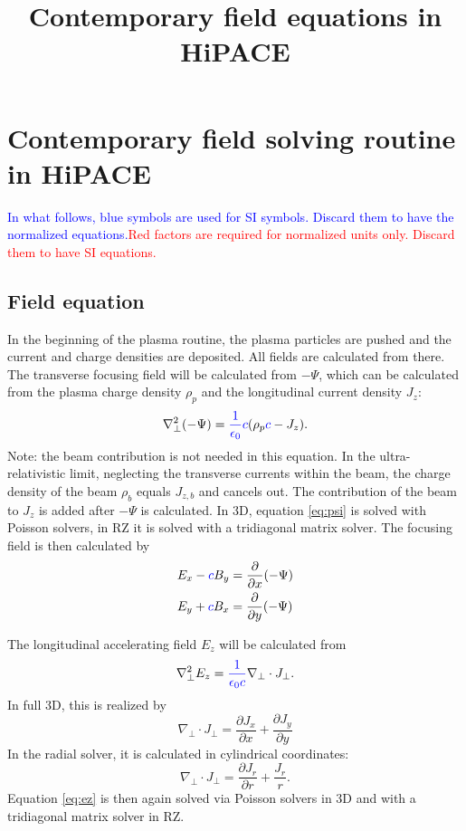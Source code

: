 \documentclass{article}
\title{Contemporary field equations in HiPACE}
\begin{document}
\section*{Contemporary field solving routine in HiPACE}
\label{se:pic_rad_field_solver}

\newcommand{\blue}[1]{\textcolor{blue}{#1}}
\newcommand{\red}[1]{\textcolor{red}{#1}}

\blue{In what follows, blue symbols are used for SI symbols. Discard them to have the normalized equations.}\red{Red factors are required for normalized units only. Discard them to have SI equations.}

\subsection*{Field equation}

In the beginning of the plasma routine, the plasma particles are pushed and the current and charge densities are deposited. All fields are calculated from there.
The transverse focusing field will be calculated from $-\Psi$, which can be calculated from the plasma charge density $\rho_p$ and the longitudinal current density $J_z$:
\begin{equation}
\nabla^2_{\perp} (- \Psi)  = \blue{\frac{1}{\epsilon_0} c} (\rho_p \blue{c} - J_z ).
\label{eq:psi}
\end{equation}
Note: the beam contribution is not needed in this equation. In the ultra-relativistic limit, neglecting the transverse currents within the beam, the charge density of the beam $\rho_b$ equals $J_{z,b}$ and cancels out. The contribution of the beam to $J_z$ is added after $-\Psi$ is calculated.
In 3D, equation \ref{eq:psi} is solved with Poisson solvers, in RZ it is solved with a tridiagonal matrix solver.
The focusing field is then calculated by
\begin{subequations}
\begin{align}
    E_x - \blue{c}B_y &= \frac{\partial}{\partial x} (-\Psi) \\
    E_y + \blue{c}B_x &= \frac{\partial}{\partial y} (-\Psi)
\end{align}
\end{subequations}


The longitudinal accelerating field $E_z$ will be calculated from
\begin{equation} \label{eq:ez}
\nabla^2_{\perp} E_z = \blue{\frac{1}{\epsilon_0 c}} \nabla_{\perp} \cdot  J_{\perp} .
\end{equation}
In full 3D, this is realized by
\begin{equation}
    \nabla_{\perp} \cdot J_{\perp} = \frac{\partial J_x}{\partial x} +  \frac{\partial J_y}{\partial y}
\end{equation}
In the radial solver, it is calculated in cylindrical coordinates:
\begin{equation}
    \nabla_{\perp} \cdot J_{\perp} = \frac{\partial J_r}{\partial r} + \frac{J_r}{r}.
\end{equation}
Equation \ref{eq:ez} is then again solved via Poisson solvers in 3D and with a tridiagonal matrix solver in RZ.
\end{document}
